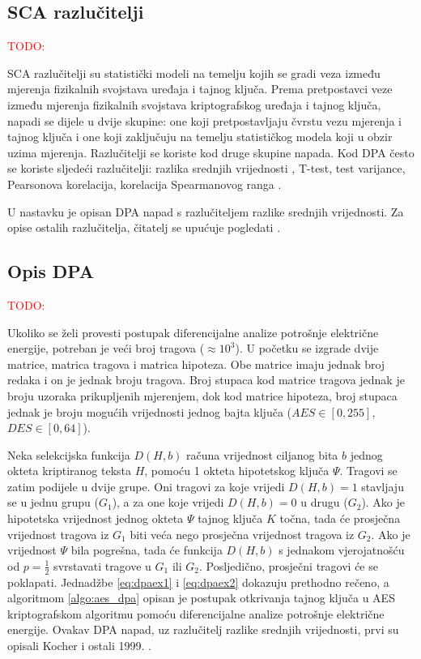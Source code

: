 \documentclass[times, utf8, numeric, diplomski]{fer}
\def\TODO#1{\noindent\textcolor{red}{TODO: \textit{#1}}\newline}
\def\todo#1{\TODO{#1}}
\begin{document}
\subsection{SCA razlučitelji}

\todo{}

SCA razlučitelji  su statistički modeli na temelju kojih se gradi veza između mjerenja fizikalnih svojstava uređaja i tajnog ključa. Prema pretpostavci veze između mjerenja fizikalnih svojstava kriptografskog uređaja i tajnog ključa, napadi se dijele u dvije skupine: one koji pretpostavljaju čvrstu vezu mjerenja i tajnog ključa i one koji zaključuju na temelju statističkog modela koji u obzir uzima mjerenja. Razlučitelji se koriste kod druge skupine napada. Kod DPA često se koriste sljedeći razlučitelji: razlika srednjih vrijednosti , T-test, test varijance, Pearsonova korelacija, korelacija Spearmanovog ranga  \citep{gierlichs2009empirical}.

U nastavku je opisan DPA napad s razlučiteljem razlike srednjih vrijednosti. Za opise ostalih razlučitelja, čitatelj se upućuje pogledati \citep{gierlichs2009empirical}.


\subsection{Opis DPA}

\todo{}

Ukoliko se želi provesti postupak diferencijalne analize potrošnje električne energije, potreban je veći broj tragova ($\approx 10^3$). U početku se izgrade dvije matrice, matrica tragova i matrica hipoteza. Obe matrice imaju jednak broj redaka i on je jednak broju tragova. Broj stupaca kod matrice tragova jednak je broju uzoraka prikupljenih mjerenjem, dok kod matrice hipoteza, broj stupaca jednak je broju mogućih vrijednosti jednog bajta ključa ($AES \in [0,255]$, $DES \in [0,64]$). 

Neka selekcijska funkcija $D(H, b)$ računa vrijednost ciljanog bita $b$ jednog okteta kriptiranog teksta $H$, pomoću 1 okteta hipotetskog ključa $\Psi$. Tragovi se zatim podijele u dvije grupe. Oni tragovi za koje vrijedi $D(H, b) = 1$ stavljaju se u jednu grupu (\textit{$G_1$}), a za one koje vrijedi $D(H, b) = 0$ u drugu (\textit{$G_2$}). Ako je hipotetska vrijednost jednog okteta $\Psi$ tajnog ključa $K$ točna, tada će prosječna vrijednost tragova iz \textit{$G_1$} biti veća nego prosječna vrijednost tragova iz \textit{$G_2$}. Ako je vrijednost $\Psi$ bila pogrešna, tada će funkcija $D(H, b)$ s jednakom vjerojatnošću od $p=\frac{1}{2}$ svrstavati tragove u \textit{$G_1$} ili \textit{$G_2$}. Posljedično, prosječni tragovi će se poklapati. Jednadžbe \ref{eq:dpaex1} i \ref{eq:dpaex2} dokazuju prethodno rečeno, a algoritmom \ref{algo:aes_dpa} opisan je postupak otkrivanja tajnog ključa u AES  kriptografskom algoritmu pomoću diferencijalne analize potrošnje električne energije. Ovakav DPA napad, uz razlučitelj razlike srednjih vrijednosti, prvi su opisali Kocher i ostali 1999. \citep{2009empirical}.
\end{document}
